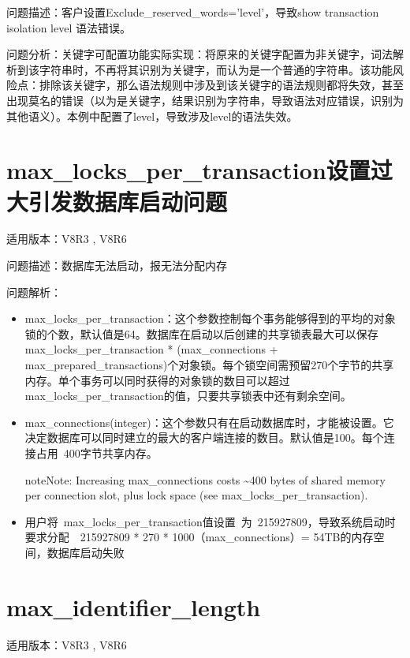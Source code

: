 \documentclass[letterpaper,10pt,english]{sphinxmanual}
\begin{document}
问题描述：客户设置Exclude\_reserved\_words=’level’，导致show transaction isolation level 语法错误。

问题分析：关键字可配置功能实际实现：将原来的关键字配置为非关键字，词法解析到该字符串时，不再将其识别为关键字，而认为是一个普通的字符串。该功能风险点：排除该关键字，那么语法规则中涉及到该关键字的语法规则都将失效，甚至出现莫名的错误（以为是关键字，结果识别为字符串，导致语法对应错误，识别为其他语义）。本例中配置了level，导致涉及level的语法失效。


\section{max\_locks\_per\_transaction设置过大引发数据库启动问题}
\label{\detokenize{parameter:max-locks-per-transaction}}
适用版本：V8R3 , V8R6

问题描述：数据库无法启动，报无法分配内存

问题解析：
\begin{itemize}
\item {} 
max\_locks\_per\_transaction：这个参数控制每个事务能够得到的平均的对象锁的个数，默认值是64。数据库在启动以后创建的共享锁表最大可以保存max\_locks\_per\_transaction * (max\_connections + max\_prepared\_transactions)个对象锁。每个锁空间需预留270个字节的共享内存。单个事务可以同时获得的对象锁的数目可以超过max\_locks\_per\_transaction的值，只要共享锁表中还有剩余空间。

\item {} 
max\_connections(integer)：这个参数只有在启动数据库时，才能被设置。它决定数据库可以同时建立的最大的客户端连接的数目。默认值是100。每个连接占用 400字节共享内存。

\begin{sphinxadmonition}{note}{Note:}
Increasing max\_connections costs \textasciitilde{}400 bytes of shared memory per connection slot, plus lock space (see max\_locks\_per\_transaction).
\end{sphinxadmonition}

\item {} 
用户将 max\_locks\_per\_transaction值设置 为 215927809，导致系统启动时要求分配  215927809 * 270 * 1000（max\_connections）= 54TB的内存空间，数据库启动失败

\end{itemize}


\section{max\_identifier\_length}
\label{\detokenize{parameter:max-identifier-length}}
适用版本：V8R3 , V8R6
\end{document}
